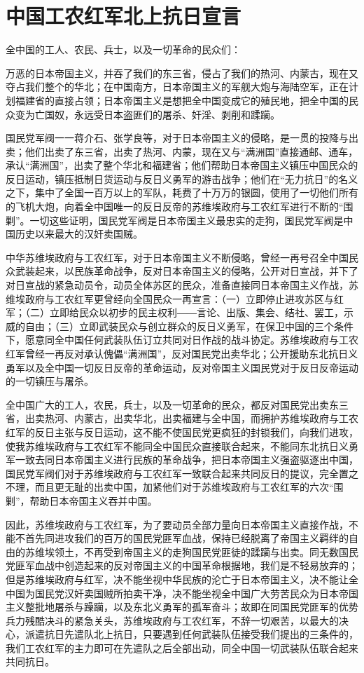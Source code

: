 \section[中国工农红军北上抗日宣言（一九三四年）]{中国工农红军北上抗日宣言}


全中国的工人、农民、兵士，以及一切革命的民众们：

万恶的日本帝国主义，并吞了我们的东三省，侵占了我们的热河、内蒙古，现在又夺占我们整个的华北；在中国南方，日本帝国主义的军舰大炮与海陆空军，正在计划福建省的直接占领；日本帝国主义是想把全中国变成它的殖民地，把全中国的民众变为亡国奴，永远受日本盗匪们的屠杀、奸淫、剥削和蹂躏。

国民党军阀一一蒋介石、张学良等，对于日本帝国主义的侵略，是一贯的投降与出卖；他们出卖了东三省，出卖了热河、内蒙，现在又与“满洲国”直接通邮、通车，承认“满洲国”，出卖了整个华北和福建省；他们帮助日本帝国主义镇压中国民众的反日运动，镇压抵制日货运动与反日义勇军的游击战争；他们在“无力抗日”的名义之下，集中了全国一百万以上的军队，耗费了十万万的银圆，使用了一切他们所有的飞机大炮，向着全中国唯一的反日反帝的苏维埃政府与工农红军进行不断的“围剿”。一切这些证明，国民党军阀是日本帝国主义最忠实的走狗，国民党军阀是中国历史以来最大的汉奸卖国贼。

中华苏维埃政府与工农红军，对于日本帝国主义不断侵略，曾经一再号召全中国民众武装起来，以民族革命战争，反对日本帝国主义的侵略，公开对日宣战，并下了对日宣战的紧急动员令，动员全体苏区的民众，准备直接同日本帝国主义作战，苏维埃政府与工农红军更曾经向全国民众一再宣言：（一）立即停止进攻苏区与红军；（二）立即给民众以初步的民主权利――言论、出版、集会、结社、罢工，示威的自由；（三）立即武装民众与创立群众的反日义勇军，在保卫中国的三个条件下，愿意同全中国任何武装队伍订立共同对日作战的战斗协定。苏维埃政府与工农红军曾经一再反对承认傀儡“满洲国”，反对国民党出卖华北；公开援助东北抗日义勇军以及全中国一切反日反帝的革命运动，反对帝国主义国民党对于反日反帝运动的一切镇压与屠杀。

全中国广大的工人，农民，兵士，以及一切革命的民众，都反对国民党出卖东三省，出卖热河、内蒙古，出卖华北，出卖福建与全中国，而拥护苏维埃政府与工农红军的反日主张与反日运动，这不能不使国民党更疯狂的封锁我们，向我们进攻，使我苏维埃政府与工农红军不能同全中国民众直接联合起来，不能同东北抗日义勇军一致去同日本帝国主义进行民族的革命战争，把日本帝国主义强盗驱逐出中国，国民党军阀们对于苏维埃政府与工农红军一致联合起来共同反日的提议，完全置之不理，而且更无耻的出卖中国，加紧他们对于苏维埃政府与工农红军的六次“围剿”，帮助日本帝国主义吞并中国。

因此，苏维埃政府与工农红军，为了要动员全部力量向日本帝国主义直接作战，不能不首先同进攻我们的百万的国民党匪军血战，保持已经脱离了帝国主义羁绊的自由的苏维埃领土，不再受到帝国主义的走狗国民党匪徒的蹂躏与出卖。同无数国民党匪军血战中创造起来的反对帝国主义的中国革命根据地，我们是不轻易放弃的；但是苏维埃政府与红军，决不能坐视中华民族的沦亡于日本帝国主义，决不能让全中国为国民党汉奸卖国贼所拍卖干净，决不能坐视全中国广大劳苦民众为日本帝国主义整批地屠杀与躁躏，以及东北义勇军的孤军奋斗；故即在同国民党匪军的优势兵力残酷决斗的紧急关头，苏维埃政府与工农红军，不辞一切艰苦，以最大的决心，派遣抗日先遣队北上抗日，只要遇到任何武装队伍接受我们提出的三条件的，我们工农红军的主力即可在先遣队之后全部出动，同全中国一切武装队伍联合起来共同抗日。

